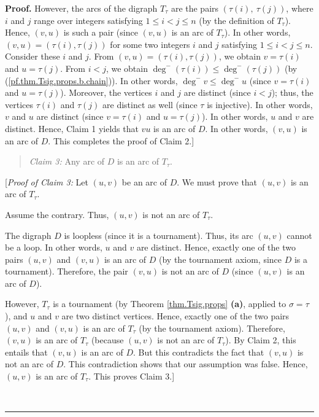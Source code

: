 \documentclass[numbers=enddot,12pt,final,onecolumn,notitlepage]{scrartcl}%
\numberwithin{exer}{subsection}
\theoremstyle{definition}
\newenvironment{statement}{\begin{quote}}{\end{quote}}
\newenvironment{proof}[1][Proof]{\noindent\textbf{#1.} }{\ \rule{0.5em}{0.5em}}
\begin{document}
\begin{proof}
However, the arcs of the digraph $T_{\tau}$ are the pairs $\left(  \tau\left(
i\right)  ,\ \tau\left(  j\right)  \right)  $, where $i$ and $j$ range over
integers satisfying $1\leq i<j\leq n$ (by the definition of $T_{\tau}$).
Hence, $\left(  v,u\right)  $ is such a pair (since $\left(  v,u\right)  $ is
an arc of $T_{\tau}$). In other words, $\left(  v,u\right)  =\left(
\tau\left(  i\right)  ,\tau\left(  j\right)  \right)  $ for some two integers
$i$ and $j$ satisfying $1\leq i<j\leq n$. Consider these $i$ and $j$. From
$\left(  v,u\right)  =\left(  \tau\left(  i\right)  ,\tau\left(  j\right)
\right)  $, we obtain $v=\tau\left(  i\right)  $ and $u=\tau\left(  j\right)
$. From $i<j$, we obtain $\deg^{-}\left(  \tau\left(  i\right)  \right)
\leq\deg^{-}\left(  \tau\left(  j\right)  \right)  $ (by
(\ref{pf.thm.Tsig.props.b.chain})). In other words, $\deg^{-}v\leq\deg^{-}u$
(since $v=\tau\left(  i\right)  $ and $u=\tau\left(  j\right)  $). Moreover,
the vertices $i$ and $j$ are distinct (since $i<j$); thus, the vertices
$\tau\left(  i\right)  $ and $\tau\left(  j\right)  $ are distinct as well
(since $\tau$ is injective). In other words, $v$ and $u$ are distinct (since
$v=\tau\left(  i\right)  $ and $u=\tau\left(  j\right)  $). In other words,
$u$ and $v$ are distinct. Hence, Claim 1 yields that $vu$ is an arc of $D$. In
other words, $\left(  v,u\right)  $ is an arc of $D$. This completes the proof
of Claim 2.]

\begin{statement}
\textit{Claim 3:} Any arc of $D$ is an arc of $T_{\tau}$.
\end{statement}

[\textit{Proof of Claim 3:} Let $\left(  u,v\right)  $ be an arc of $D$. We
must prove that $\left(  u,v\right)  $ is an arc of $T_{\tau}$.

Assume the contrary. Thus, $\left(  u,v\right)  $ is not an arc of $T_{\tau}$.

The digraph $D$ is loopless (since it is a tournament). Thus, its arc $\left(
u,v\right)  $ cannot be a loop. In other words, $u$ and $v$ are distinct.
Hence, exactly one of the two pairs $\left(  u,v\right)  $ and $\left(
v,u\right)  $ is an arc of $D$ (by the tournament axiom, since $D$ is a
tournament). Therefore, the pair $\left(  v,u\right)  $ is not an arc of $D$
(since $\left(  u,v\right)  $ is an arc of $D$).

However, $T_{\tau}$ is a tournament (by Theorem \ref{thm.Tsig.props}
\textbf{(a)}, applied to $\sigma=\tau$), and $u$ and $v$ are two distinct
vertices. Hence, exactly one of the two pairs $\left(  u,v\right)  $ and
$\left(  v,u\right)  $ is an arc of $T_{\tau}$ (by the tournament axiom).
Therefore, $\left(  v,u\right)  $ is an arc of $T_{\tau}$ (because $\left(
u,v\right)  $ is not an arc of $T_{\tau}$). By Claim 2, this entails that
$\left(  v,u\right)  $ is an arc of $D$. But this contradicts the fact that
$\left(  v,u\right)  $ is not an arc of $D$. This contradiction shows that our
assumption was false. Hence, $\left(  u,v\right)  $ is an arc of $T_{\tau}$.
This proves Claim 3.] \medskip


\end{proof}
\end{document}
